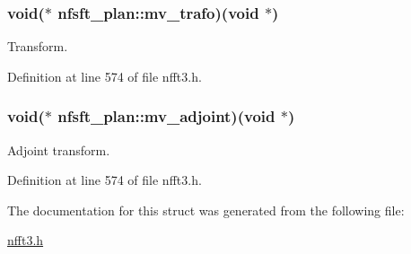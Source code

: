 \hypertarget{structnfsft__plan_a01bf30c31f886ffa9d486c010a452051}{
\subsubsection[{mv\-\_\-trafo}]{\setlength{\rightskip}{0pt plus 5cm}void($\ast$ nfsft\-\_\-plan\-::mv\-\_\-trafo)(void $\ast$)}}\label{structnfsft__plan_a01bf30c31f886ffa9d486c010a452051}


Transform. 



Definition at line 574 of file nfft3.\-h.

\hypertarget{structnfsft__plan_a14cc99f56f6a61958aef26f80aac6f12}{
\subsubsection[{mv\-\_\-adjoint}]{\setlength{\rightskip}{0pt plus 5cm}void($\ast$ nfsft\-\_\-plan\-::mv\-\_\-adjoint)(void $\ast$)}}\label{structnfsft__plan_a14cc99f56f6a61958aef26f80aac6f12}


Adjoint transform. 



Definition at line 574 of file nfft3.\-h.



The documentation for this struct was generated from the following file\-:\begin{DoxyCompactItemize}
\item 
\hyperlink{nfft3_8h}{nfft3.\-h}\end{DoxyCompactItemize}
